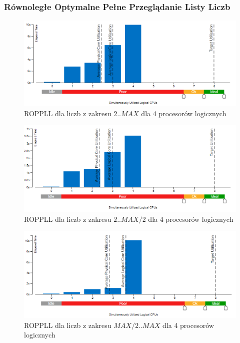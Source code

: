 \documentclass{article}
\begin{document}
            \subsubsection{Równoległe Optymalne Pełne Przeglądanie Listy Liczb}
                \begin{figure}[H]
                    \includegraphics[width=13cm]{rownolegly_funcion_bezsita4_2_MAX}
                    \caption{\gls{ROPPLL} dla liczb z zakresu $2 .. MAX$ dla 4 procesorów logicznych}
                \end{figure}
                \begin{figure}[H]
                    \includegraphics[width=13cm]{rownolegly_funcion_bezsita4_2_MAX2}
                    \caption{\gls{ROPPLL} dla liczb z zakresu $2 .. MAX / 2$ dla 4 procesorów logicznych}
                \end{figure}
                \begin{figure}[H]
                    \includegraphics[width=13cm]{rownolegly_funcion_bezsita4_MAX2_MAX}
                    \caption{\gls{ROPPLL} dla liczb z zakresu $MAX / 2 .. MAX$ dla 4 procesorów logicznych}
                \end{figure}
\end{document}
